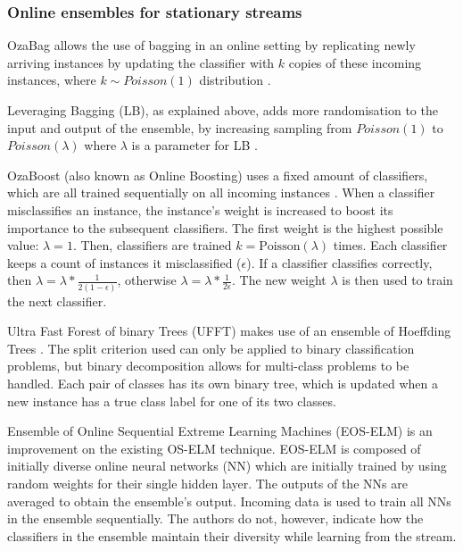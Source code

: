 \subsubsection{Online ensembles for stationary streams}
OzaBag allows the use of bagging in an online setting by replicating newly arriving instances by updating the classifier with $k$ copies of these incoming instances, where $k \sim Poisson(1)$ distribution \cite{oza2005online, KRAWCZYK2017132, }.

Leveraging Bagging (LB), as explained above, adds more randomisation to the input and output of the ensemble, by increasing sampling from $Poisson(1)$ to $Poisson(\lambda)$ where $\lambda$ is a parameter for LB \cite{bifet2010leveraging, KRAWCZYK2017132}.

OzaBoost (also known as Online Boosting) uses a fixed amount of classifiers, which are all trained sequentially on all incoming instances \cite{oza2005online, KRAWCZYK2017132, }. When a classifier misclassifies an instance, the instance's weight is increased to boost its importance to the subsequent classifiers. The first weight is the highest possible value: $\lambda=1$. Then, classifiers are trained $k=\text{Poisson}(\lambda)$ times. Each classifier keeps a count of instances it misclassified ($\epsilon$). If a classifier classifies correctly, then $\lambda = \lambda * \frac{1}{2(1-\epsilon)}$, otherwise $\lambda = \lambda * \frac{1}{2\epsilon}$. The new weight $\lambda$ is then used to train the next classifier.

Ultra Fast Forest of binary Trees (UFFT) makes use of an ensemble of Hoeffding Trees \cite{gama2005learning, KRAWCZYK2017132, }. The split criterion used can only be applied to binary classification problems, but binary decomposition allows for multi-class problems to be handled. Each pair of classes has its own binary tree, which is updated when a new instance has a true class label for one of its two classes.

Ensemble of Online Sequential Extreme Learning Machines (EOS-ELM) \cite{lan2009ensemble, KRAWCZYK2017132} is an improvement on the existing OS-ELM technique. EOS-ELM is composed of initially diverse online neural networks (NN) which are initially trained by using random weights for their single hidden layer. The outputs of the NNs are averaged to obtain the ensemble's output. Incoming data is used to train all NNs in the ensemble sequentially. The authors do not, however, indicate how the classifiers in the ensemble maintain their diversity while learning from the stream.

